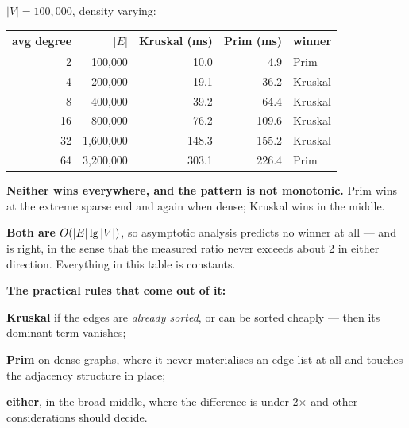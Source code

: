 \begin{worked}
$|V| = 100{,}000$, density varying:

\begin{center}
\begin{tabular}{@{}rrrrl@{}}
\toprule
\rowcolor{primary!15}
avg degree & $|E|$ & Kruskal (ms) & Prim (ms) & winner \\
\midrule
 2 &   100{,}000 &  10.0 &   4.9 & Prim \\
 4 &   200{,}000 &  19.1 &  36.2 & Kruskal \\
 8 &   400{,}000 &  39.2 &  64.4 & Kruskal \\
16 &   800{,}000 &  76.2 & 109.6 & Kruskal \\
32 & 1{,}600{,}000 & 148.3 & 155.2 & Kruskal \\
64 & 3{,}200{,}000 & 303.1 & 226.4 & Prim \\
\bottomrule
\end{tabular}
\end{center}

\smallskip
\textbf{Neither wins everywhere, and the pattern is not monotonic.} Prim wins
at the extreme sparse end and again when dense; Kruskal wins in the middle.

\smallskip
\textbf{Both are $O(|E|\operatorname{lg}|V|)$}, so asymptotic analysis predicts no
winner at all --- and is right, in the sense that the measured ratio never
exceeds about 2 in either direction. Everything in this table is constants.

\smallskip
\textbf{The practical rules that come out of it:}
\begin{tight}
  \item \textbf{Kruskal} if the edges are \emph{already sorted}, or can be
        sorted cheaply --- then its dominant term vanishes;
  \item \textbf{Prim} on dense graphs, where it never materialises an edge
        list at all and touches the adjacency structure in place;
  \item \textbf{either}, in the broad middle, where the difference is under
        2$\times$ and other considerations should decide.
\end{tight}
\end{worked}


